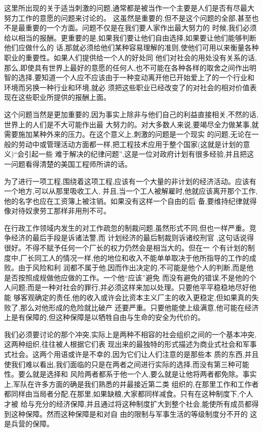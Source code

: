 ﻿\documentclass[12pt]{article}
\begin{document}
这里所出现的关于适当刺激的问题,通常都是被当作一个主要是人们是否有尽最大努力工作的意愿的问题来讨论的。
这虽然是重要的,但不是这个问题的全部,甚至也不是最重要的一个方面。问题不仅是在我们要人家作出最大努力的
时候,我们必须给以相当的报酬。更重要的是,如果我们要让他们自由选择,如果要让他们能够判断他们应做什么的
话,那就必须给他们某种容易理解的准则,使他们可用以来衡量各种职业的重要性。如果人们提供给一个人的好处同
他们对社会的用处没有关系的话,那么,即使具有世界上最好的意愿的任何人,也不可能在各种各样的取舍之间作出明
智的选择,要知道一个人应不应该由于一种变动离开他已开始爱上了的一个行业和环境而另换一种行业和环境,就必
须把这些职业已经改变了的对社会的相对价值表现在这些职业所提供的报酬上面。

这个问题当然是更加重要的,因为事实上除非与他们自己的利益直接相关,不然的话,世界上的人们是不大可能作出最
大努力的。对大多数人来说,要竭尽全力做某事,就需要施加某种外来的压力。在这个意义上,刺激的问题是一个现实
的问题,无论在一般的劳动中或管理活动方面都一样,把工程技术应用于整个国家(这就是计划的意义)``会引起一些
难于解决的纪律问题'',这是一位对政府计划有很多经验,并且把这一问题看得清楚的美国工程师所讲的话。

为了进行一项工程,围绕着这项工程,应该有一个大量的非计划的经济活动。应该有一个地方,可以从那里吸收工人,
并且,当一个工人被解雇时,他就应该离开那个工作,他的名字也应在工资簿上被注销。如果没有这样一个自由的后
备,要维持纪律就得像对待奴隶劳工那样非用刑不可。

在行政工作领域内发生的对工作疏忽的制裁问题,虽然形式不同,但也一样严重。竞争经济的最后手段是诉诸法警,而
计划经济的最后制裁则诉诸绞刑官 ,这句话说得很好。不得不赋予任何一个厂长的权力仍然会是相当大的。但在一
个有计划的制度中,厂长同工人的情况一样,他的地位和收入不能单单取决于他所指导的工作的成败。由于风险和利
润都不属于他,因而作出决定的,不可能是他个人的判断,而是他是否按照成规做他应做的工作。一个他``应该''避免
而没有避免的错误,不是他的个人问题;而是一种对社会的罪行,并必须这样来加以处理。只要他平平稳稳地尽好他能
够客观确定的责任,他的收入或许会比资本主义厂主的收入更稳定,但如果真的失败了,那么对他形成的危险就比破产
还要严重。只要他能使上级满意,他可能在经济上是有保障的,但这种保障是以牺牲自由与生命的安全为代价的。

我们必须要讨论的那个冲突,实际上是两种不相容的社会组织之间的一个基本冲突,这两种组织,往往被人根据它们表
现出来的最独特的形式描述为商业式社会和军事式社会。这两个用语或许是不幸的,因为它们让人们注意的是那些本
质的东西,并且使我们难以看出,我们面临的只是在两者之间进行实际的选择,而没有第三种可能性。要么就是选择和
风险两者都系于他一个人,要么就是让他将两者都免除。事实上,军队在许多方面的确是我们熟悉的并最接近第二类
组织的,在那里工作和工作者都同样由当局者分配,在那里,如果缺粮,大家都同样减食。只有在这种制度下,个人才被
给与充分的经济保障,并且通过将这种制度扩大到整个社会,能使所有成员都得到这种保障。然而这种保障是和对自
由的限制与军事生活的等级制度分不开的 \myrule 这是兵营的保障。
\end{document}
